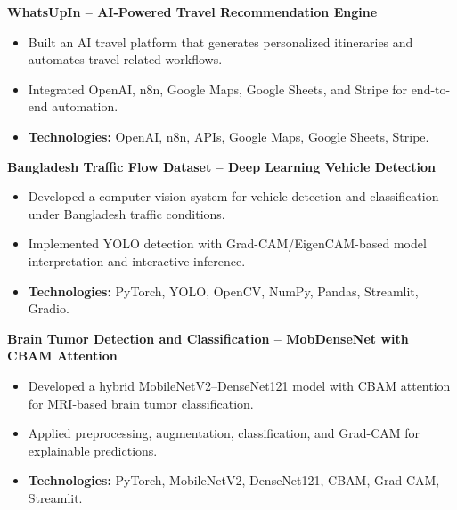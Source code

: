 ﻿\documentclass[10pt,a4paper]{article}
\begin{document}
\textbf{WhatsUpIn -- AI-Powered Travel Recommendation Engine}

\begin{itemize}

\item Built an AI travel platform that generates personalized itineraries and automates travel-related workflows.

\item Integrated OpenAI, n8n, Google Maps, Google Sheets, and Stripe for end-to-end automation.

\item \textbf{Technologies:} OpenAI, n8n, APIs, Google Maps, Google Sheets, Stripe.

\end{itemize}

\textbf{Bangladesh Traffic Flow Dataset -- Deep Learning Vehicle Detection}

\begin{itemize}

\item Developed a computer vision system for vehicle detection and classification under Bangladesh traffic conditions.

\item Implemented YOLO detection with Grad-CAM/EigenCAM-based model interpretation and interactive inference.

\item \textbf{Technologies:} PyTorch, YOLO, OpenCV, NumPy, Pandas, Streamlit, Gradio.

\end{itemize}

\textbf{Brain Tumor Detection and Classification -- MobDenseNet with CBAM Attention}

\begin{itemize}

\item Developed a hybrid MobileNetV2--DenseNet121 model with CBAM attention for MRI-based brain tumor classification.

\item Applied preprocessing, augmentation, classification, and Grad-CAM for explainable predictions.

\item \textbf{Technologies:} PyTorch, MobileNetV2, DenseNet121, CBAM, Grad-CAM, Streamlit.

\end{itemize}

\end{document}
